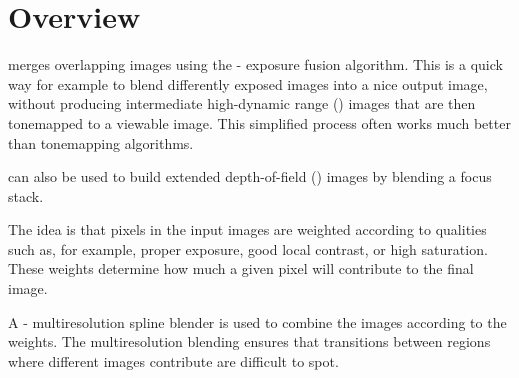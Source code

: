 

\chapter[Overview]{\label{sec:overview}%
  Overview}

%
%
%
%
%
%
%
\begin{sloppypar}
  \App{} merges overlapping images using the
  -\- exposure fusion
  algorithm.\footnotemark{} This is a quick way for example to blend differently exposed images
  into a nice output image, without producing intermediate high-dynamic range ()
  images that are then tonemapped to a viewable image.  This simplified process often works much
  better than tonemapping algorithms.%
\end{sloppypar}

%
%
\App{} can also be used to build extended depth-of-field () images by blending a
focus stack.

The idea is that pixels in the input images are weighted according to qualities such as, for
example, proper exposure, good local contrast, or high saturation.  These weights determine how
much a given pixel will contribute to the final image.

%
%
%
%
%
A - multiresolution spline blender\footnotemark{} is used
to combine the images according to the weights.  The multiresolution blending ensures that
transitions between regions where different images contribute are difficult to spot.%
%

